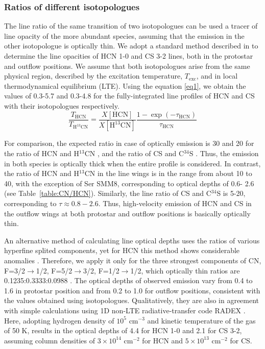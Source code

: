 \documentclass{aa}
\begin{document}
\subsubsection{Ratios of different isotopologues}
 
The line ratio of the same transition of two isotopologues can be used a tracer of 
line opacity of the more abundant species, assuming that the emission in the 
other isotopologue is optically thin. We adopt a standard method described in \citep{Gol84} 
to determine the line opacities of HCN 1-0 and CS 3-2 lines, both in the protostar 
and outflow positions. We assume that both isotopologues arise from the 
same physical region, described by the excitation temperature, $T_\mathrm{exc}$, and 
in local thermodynamical equilibrium (LTE). Using the equation \ref{eq1}, we obtain
the values of 0.3-5.7 and 0.3-4.8 for the fully-integrated line profiles of HCN and CS with their isotopologues respectively.
\begin{equation} 
\label{eq1} \frac{T_{\mathrm{HCN}}}{T_{\mathrm{H^{13}CN}}} =
\frac{X[\mathrm{HCN}]}{X[\mathrm{H^{13}CN}]} \frac
{1-\exp(-\tau_{\mathrm{HCN}})}{\tau_{\mathrm{HCN}}} 
\end{equation} 

For comparison, the expected ratio in case of optically emission is 30 and 20 for the ratio of HCN and H$^{13}$CN \citep{Dan13}, and the ratio of CS and C$^{34}$S \citep{Ter10}. Thus,
the emission in both species is optically thick when the entire
profile is considered. In contrast, the ratio of HCN and H$^{13}$CN
in the line wings is in the range from about 10 to 40, with the
exception of Ser SMM8, corresponding to optical depths of 0.6-
2.6 (see Table~\ref{table:CN/HCN}). Similarly, the line ratio of CS and C$^{34}$S is 5-20,
corresponding to $\tau \approx 0.8-2.6$. Thus, high-velocity emission of
HCN and CS in the outflow wings at both protostar and outflow
positions is basically optically thin.

An alternative method of calculating line optical depths
uses the ratios of various hyperfine splited components, yet for HCN this method shows considerable anomalies
\citep{Lou12}. Therefore, we apply it only
for the three strongest components of CN, F=3/2$\rightarrow$1/2, F=5/2$\rightarrow$3/2, F=1/2$\rightarrow$1/2, which optically thin ratios are
0.1235:0.3333:0.0988 \citep{Ska83}. The optical
depths of observed emission vary from 0.4 to 1.6 in protostar
position and from 0.2 to 1.0 for outflow positions, consistent
with the values obtained using isotopologues. Qualitatively,
they are also in agreement with simple calculations using 1D
non-LTE radiative-transfer code RADEX \citep{vdT07}. Here, adopting hydrogen density of $10^5$ cm$^{-3}$ and kinetic temperature of the gas of 50 K, results in the optical
depths of 4.4 for HCN 1-0 and 2.1 for CS 3-2, assuming column densities of $3 \times 10^{14}$ cm$^{-2}$ for HCN and $5 \times 10^{13}$ cm$^{-2}$ for
CS.
\end{document}
